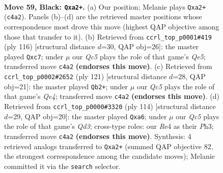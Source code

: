 \documentclass[11pt]{article}
\begin{document}
\clearpage

\begin{figure}[p]\centering
\begin{subfigure}{0.46\textwidth}\centering
\resizebox{\linewidth}{!}{%
\newchessgame
\chessboard[
  setfen={5Q2/8/5pk1/3p4/2q1r3/6P1/P5KP/8 b - - 13 59},
  showmover=false,
  pgfstyle=straightmove, color=movearrow, markmove={c4-a2}
]}
\caption{}
\end{subfigure}\hfill
\begin{subfigure}{0.46\textwidth}\centering
\resizebox{\linewidth}{!}{%
\newchessgame
\chessboard[
  setfen={6k1/2p2p2/8/4Q1p1/3P2Pq/8/8/5K2 w - - 0 59},
  showmover=false,
  pgfstyle=straightmove, color=movearrow, markmove={e5-c7}
]}
\caption{}
\end{subfigure}
\\[4pt]
\begin{subfigure}{0.46\textwidth}\centering
\resizebox{\linewidth}{!}{%
\newchessgame
\chessboard[
  setfen={8/8/5p1k/p3q3/Q7/5PP1/5K2/8 b - - 2 61},
  showmover=false,
  pgfstyle=straightmove, color=movearrow, markmove={e5-b2}
]}
\caption{}
\end{subfigure}\hfill
\begin{subfigure}{0.46\textwidth}\centering
\resizebox{\linewidth}{!}{%
\newchessgame
\chessboard[
  setfen={7k/6p1/p6p/8/1q4P1/3Q3P/5P1K/8 w - - 2 58},
  showmover=false,
  pgfstyle=straightmove, color=movearrow, markmove={d3-a6}
]}
\caption{}
\end{subfigure}
\caption{\textbf{Move 59, Black: \texttt{Qxa2+}.} (a) Our position; Melanie plays \texttt{Qxa2+} (\texttt{c4a2}). Panels (b)--(d) are the retrieved master positions whose correspondence most drove this move (highest QAP objective among those that transfer to it). (b) Retrieved from \texttt{ccrl\_top\_p0001\#419} (ply 116) [structural distance $d$=30, QAP obj=26]: the master played \texttt{Qxc7}; under $\mu$ our \emph{Qc5} plays the role of that game's \emph{Qe5}; transferred move \texttt{c4a2} \textbf{(endorses this move)}. (c) Retrieved from \texttt{ccrl\_top\_p0002\#2652} (ply 121) [structural distance $d$=28, QAP obj=21]: the master played \texttt{Qb2+}; under $\mu$ our \emph{Qc5} plays the role of that game's \emph{Qe4}; transferred move \texttt{c4a2} \textbf{(endorses this move)}. (d) Retrieved from \texttt{ccrl\_top\_p0000\#3320} (ply 114) [structural distance $d$=29, QAP obj=20]: the master played \texttt{Qxa6}; under $\mu$ our \emph{Qc5} plays the role of that game's \emph{Qd3}; cross-type roles: our \emph{R}e4 as their \emph{P}h3; transferred move \texttt{c4a2} \textbf{(endorses this move)}. Synthesis: 4 retrieved analogs transferred to \texttt{Qxa2+} (summed QAP objective 82, the strongest correspondence among the candidate moves); Melanie committed it via the \texttt{search} selector.}
\label{fig:thought-m117}
\end{figure}
\end{document}
